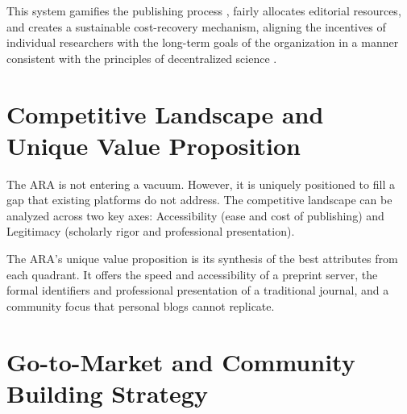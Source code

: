 \documentclass[conference, compsoc, 11pt]{IEEEtran}
\begin{document}
This system gamifies the publishing process \cite{deterding2011}, fairly allocates editorial resources, and creates a sustainable cost-recovery mechanism, aligning the incentives of individual researchers with the long-term goals of the organization in a manner consistent with the principles of decentralized science \cite{hamburg2021}.

\section{Competitive Landscape and Unique Value Proposition}

The ARA is not entering a vacuum. However, it is uniquely positioned to fill a gap that existing platforms do not address. The competitive landscape can be analyzed across two key axes: Accessibility (ease and cost of publishing) and Legitimacy (scholarly rigor and professional presentation).

\begin{table}[!t]
\caption{Competitive Landscape Analysis}
\label{table_competitive}
\centering
{}
\end{table}

The ARA’s unique value proposition is its synthesis of the best attributes from each quadrant. It offers the speed and accessibility of a preprint server, the formal identifiers and professional presentation of a traditional journal, and a community focus that personal blogs cannot replicate.

\section{Go-to-Market and Community Building Strategy}
\end{document}

